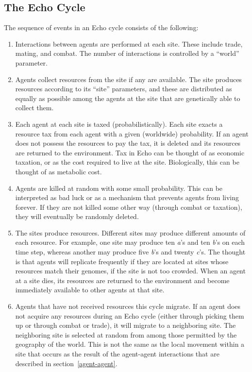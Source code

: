 \subsection{The Echo Cycle}

The sequence of events in an Echo cycle consists of the following:
\begin{enumerate}
\item
Interactions between agents are performed at each site.  These include
trade, mating, and combat.  The number of interactions is controlled
by a ``world'' parameter.

\item
Agents collect resources from the site if any are available.  The site
produces resources according to its ``site'' parameters, and these are
distributed as equally as possible among the agents at the site that
are genetically able to collect them.

\item
Each agent at each site is taxed (probabilistically).
Each site exacts a resource tax from each agent with a given
(worldwide) probability. If an agent does not possess the resources to
pay the tax, it is deleted and its resources are returned to the
environment.  Tax in Echo can be thought of as economic taxation, or
as the cost required to live at the site.  Biologically, this can be
thought of as metabolic cost.

\item
Agents are killed at random with some small probability.  This can be
interpreted as bad luck or as a mechanism that prevents agents from
living forever. If they are not killed some other way (through combat
or taxation), they will eventually be randomly deleted.  

\item
The sites produce resources. Different sites may produce different
amounts of each resource.  For example, one site may produce ten {\em
a}'s and ten {\em b}'s on each time step, whereas another may produce
five {\em b}'s and twenty {\em c}'s.  The thought is that agents will
replicate frequently if they are located at sites whose resources
match their genomes, if the site is not too crowded.  When an agent at
a site dies, its resources are returned to the environment and become
immediately available to other agents at that site.

\item
Agents that have not received resources this cycle migrate.  If an
agent does not acquire any resources during an Echo cycle (either
through picking them up or through combat or trade), it will migrate
to a neighboring site. The neighboring site is selected at random from
among those permitted by the geography of the world. This is
not the same as the local movement within a site that occurs as the
result of the agent-agent interactions that are described in
section~\ref{agent-agent}.


\end{enumerate}

